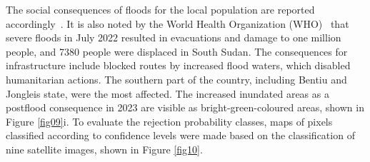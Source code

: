 \documentclass[analytics,article,accept,pdftex,moreauthors]{Definitions/mdpi}
\begin{document}
The social consequences of floods for the local population are reported accordingly~\cite{ReliefWeb}. It is also noted by the World Health Organization (WHO)~\cite{WHO2023} that severe floods in July 2022 resulted in evacuations and damage to one million people, and 7380 people were displaced in South Sudan. The consequences for infrastructure include blocked routes by increased flood waters, which disabled humanitarian actions. The southern part of the country, including Bentiu and Jongleis state, were the most affected. The increased inundated areas as a postflood consequence in 2023 are visible as bright-green-coloured areas, shown in Figure \ref{fig09}i. To evaluate the rejection probability classes, maps of pixels classified according to confidence levels were made based on the classification of nine satellite images, shown in Figure \ref{fig10}. %
\end{document}
